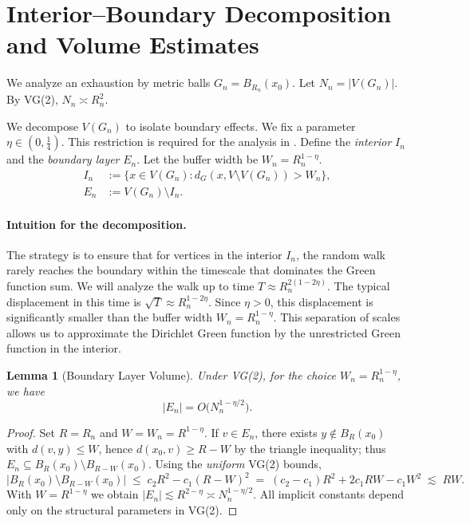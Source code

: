 \documentclass{article}
\numberwithin{equation}{section}
\newtheorem{lemma}[theorem]{Lemma}
\theoremstyle{definition}
\theoremstyle{remark}
\begin{document}
\section{Interior--Boundary Decomposition and Volume Estimates}\label{sec:decomposition}

We analyze an exhaustion by metric balls $G_n = B_{R_n}(x_0)$. Let $N_n = |V(G_n)|$. By VG(2), $N_n \asymp R_n^2$.

We decompose $V(G_n)$ to isolate boundary effects. We fix a parameter $\eta \in (0, \frac{1}{4})$. This restriction is required for the analysis in . Define the \emph{interior} $I_n$ and the \emph{boundary layer} $E_n$. Let the buffer width be $W_n = R_n^{1-\eta}$.
\begin{align*}
I_n &:= \{x \in V(G_n) : d_G(x, V \setminus V(G_n)) > W_n\}, \\
E_n &:= V(G_n) \setminus I_n.
\end{align*}

\paragraph{Intuition for the decomposition.} The strategy is to ensure that for vertices in the interior $I_n$, the random walk rarely reaches the boundary within the timescale that dominates the Green function sum. We will analyze the walk up to time $T \approx R_n^{2(1-2\eta)}$. The typical displacement in this time is $\sqrt{T} \approx R_n^{1-2\eta}$. Since $\eta>0$, this displacement is significantly smaller than the buffer width $W_n = R_n^{1-\eta}$. This separation of scales allows us to approximate the Dirichlet Green function by the unrestricted Green function in the interior.

\begin{lemma}[Boundary Layer Volume]\label{lem:boundary_volume}
Under VG(2), for the choice $W_n = R_n^{1-\eta}$, we have
\[
    |E_n| = O\bigl(N_n^{1-\eta/2}\bigr).
\]
\end{lemma}
\begin{proof}
Set $R=R_n$ and $W=W_n=R^{1-\eta}$. If $v\in E_n$, there exists $y\notin B_R(x_0)$ with $d(v,y)\le W$, hence
$d(x_0,v)\ge R-W$ by the triangle inequality; thus $E_n\subseteq B_R(x_0)\setminus B_{R-W}(x_0)$. Using the \emph{uniform} VG(2) bounds,
\[
|B_R(x_0)\setminus B_{R-W}(x_0)| \;\le\; c_2 R^2 - c_1 (R-W)^2
  \;=\; (c_2-c_1)R^2 + 2c_1 R W - c_1 W^2
  \;\lesssim\; R W.
\]
With $W=R^{1-\eta}$ we obtain $|E_n|\lesssim R^{2-\eta}\asymp N_n^{1-\eta/2}$.
All implicit constants depend only on the structural parameters in VG(2).
\end{proof}
\end{document}
